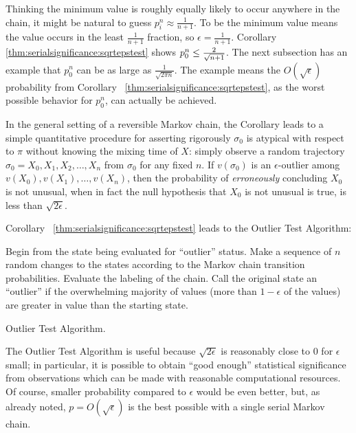 \documentclass[12pt]{article}
\begin{document}
Thinking the minimum value is roughly equally likely to occur anywhere
in the chain, it might be natural to guess \( p_i^n \approx \frac{1}{n+1}
\).  To be the minimum value means the value occurs in the least \(
\frac{1}{n+1} \) fraction, so \( \epsilon = \frac {1}{n+1} \).
Corollary~%
\ref{thm:serialsignificance:sqrtepstest} shows \( p_0^n \le \frac{2}{\sqrt
{%
n+1}} \).  The next subsection has an example that \( p_0^n \) can be as
large as \( \frac{1}{\sqrt{2\pi n}} \).  The example means the \( O (\sqrt
{\epsilon}) \) probability from Corollary~%
\ref{thm:serialsignificance:sqrtepstest}, as the worst possible behavior
for \( p_0^n \), can actually be achieved.

In the general setting of a reversible Markov chain, the Corollary leads
to a simple quantitative procedure for asserting rigorously \( \sigma_0 \)
is atypical with respect to \( \pi \) without knowing the mixing time of
\( X \):  simply observe a random trajectory \( \sigma_0 = X_0 , X_1, X_2,
\dots, X_n \) from \( \sigma_0 \) for any fixed \( n \).  If \( v(\sigma_0
) \) is an \( \epsilon \)-outlier among \( v(X_0), v(X_1), \dots, v(X_n)
\), then the probability of \emph{erroneously} concluding \( X_0 \) is
not unusual, when in fact the null hypothesis that \( X_0 \) is not
unusual is true, is less than \( \sqrt{2 \epsilon } \).

Corollary~%
\ref{thm:serialsignificance:sqrtepstest} leads to the Outlier Test
Algorithm:%

\begin{algorithm}[H]
  \DontPrintSemicolon
   Begin from
  the state being evaluated for ``outlier'' status.\;
  Make a sequence of \( n \) random changes to the states according to the Markov
  chain transition probabilities.\;
  Evaluate the labeling of the chain.\;
  Call the original state an ``outlier'' if the overwhelming
  majority of values (more than \( 1 - \epsilon \) of the values) are
  greater in value than the starting state.\;
    \caption{Outlier Test Algorithm.}
\end{algorithm}

\begin{remark}
    The Outlier Test Algorithm is useful because \( \sqrt{2\epsilon} \)
    is reasonably close to \( 0 \) for \( \epsilon \) small; in
    particular, it is possible to obtain ``good enough'' statistical
    significance from observations which can be made with reasonable
    computational resources.  Of course, smaller probability compared to
    \( \epsilon \) would be even better, but, as already noted, \( p = O
    (\sqrt {\epsilon}) \) is the best possible with a single serial
    Markov chain.
\end{remark}
\end{document}
